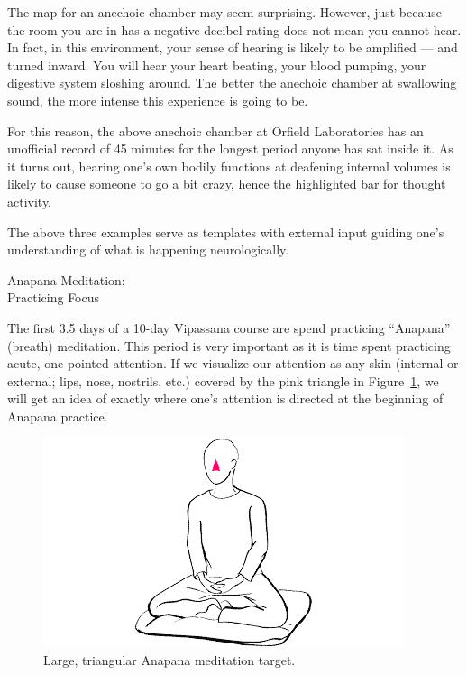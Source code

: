 \documentclass{article}
\begin{document}
The map for an anechoic chamber may seem surprising. However, just because the room you are in has a negative decibel rating does not mean you cannot hear. In fact, in this environment, your sense of hearing is likely to be amplified --- and turned inward. You will hear your heart beating, your blood pumping, your digestive system sloshing around. The better the anechoic chamber at swallowing sound, the more intense this experience is going to be.

For this reason, the above anechoic chamber at Orfield Laboratories \cite{orfield} has an unofficial record of 45 minutes for the longest period anyone has sat inside it. As it turns out, hearing one's own bodily functions at deafening internal volumes is likely to cause someone to go a bit crazy, hence the highlighted bar for thought activity.

The above three examples serve as templates with external input guiding one's understanding of what is happening neurologically.


\pagebreak

\begin{center}
  \Huge{Anapana Meditation:}\\
  \Huge{Practicing Focus}
\end{center}

The first 3.5 days of a 10-day Vipassana course are spend practicing ``Anapana'' (breath) meditation. This period is very important as it is time spent practicing acute, one-pointed attention. If we visualize our attention as any skin (internal or external; lips, nose, nostrils, etc.) covered by the pink triangle in Figure~\ref{fig:burmese-anapana-triangle}, we will get an idea of exactly where one's attention is directed at the beginning of Anapana practice.

\begin{figure}[h]
  \centering
  \includegraphics[width=\linewidth]{images/burmese-anapana-triangle.png}
  \caption{Large, triangular Anapana meditation target.}
  \label{fig:burmese-anapana-triangle}
\end{figure}
\end{document}
